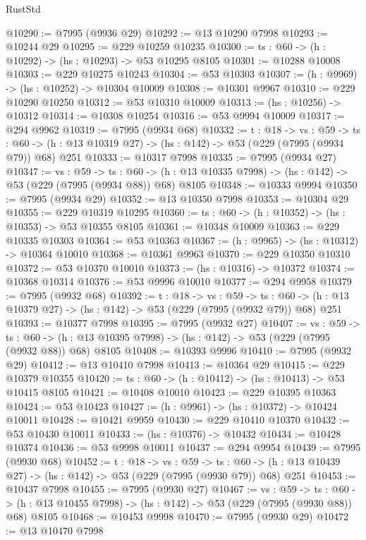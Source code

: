 \begin{lexlean}{RustStd}
\begin{coremodule}
@10290 := @7995 (@9936 @29)
@10292 := @13 @10290 @7998
@10293 := @10244 @29
@10295 := @229 @10259 @10235
@10300 := {ts : @60} -> (h : @10292) -> (hs : @10293) -> @53 @10295 @8105
@10301 := @10288 @10008
@10303 := @229 @10275 @10243
@10304 := @53 @10303
@10307 := (h : @9969) -> (hs : @10252) -> @10304 @10009
@10308 := @10301 @9967
@10310 := @229 @10290 @10250
@10312 := @53 @10310 @10009
@10313 := (hs : @10256) -> @10312
@10314 := @10308 @10254
@10316 := @53 @9994 @10009
@10317 := @294 @9962
@10319 := @7995 (@9934 @68)
@10332 := {t : @18} ->
  {vs : @59} ->
  {ts : @60} -> (h : @13 @10319 @27) -> (hs : @142) -> @53 (@229 (@7995 (@9934 @79)) @68) @251
@10333 := @10317 @7998
@10335 := @7995 (@9934 @27)
@10347 := {vs : @59} ->
  {ts : @60} -> (h : @13 @10335 @7998) -> (hs : @142) -> @53 (@229 (@7995 (@9934 @88)) @68) @8105
@10348 := @10333 @9994
@10350 := @7995 (@9934 @29)
@10352 := @13 @10350 @7998
@10353 := @10304 @29
@10355 := @229 @10319 @10295
@10360 := {ts : @60} -> (h : @10352) -> (hs : @10353) -> @53 @10355 @8105
@10361 := @10348 @10009
@10363 := @229 @10335 @10303
@10364 := @53 @10363
@10367 := (h : @9965) -> (hs : @10312) -> @10364 @10010
@10368 := @10361 @9963
@10370 := @229 @10350 @10310
@10372 := @53 @10370 @10010
@10373 := (hs : @10316) -> @10372
@10374 := @10368 @10314
@10376 := @53 @9996 @10010
@10377 := @294 @9958
@10379 := @7995 (@9932 @68)
@10392 := {t : @18} ->
  {vs : @59} ->
  {ts : @60} -> (h : @13 @10379 @27) -> (hs : @142) -> @53 (@229 (@7995 (@9932 @79)) @68) @251
@10393 := @10377 @7998
@10395 := @7995 (@9932 @27)
@10407 := {vs : @59} ->
  {ts : @60} -> (h : @13 @10395 @7998) -> (hs : @142) -> @53 (@229 (@7995 (@9932 @88)) @68) @8105
@10408 := @10393 @9996
@10410 := @7995 (@9932 @29)
@10412 := @13 @10410 @7998
@10413 := @10364 @29
@10415 := @229 @10379 @10355
@10420 := {ts : @60} -> (h : @10412) -> (hs : @10413) -> @53 @10415 @8105
@10421 := @10408 @10010
@10423 := @229 @10395 @10363
@10424 := @53 @10423
@10427 := (h : @9961) -> (hs : @10372) -> @10424 @10011
@10428 := @10421 @9959
@10430 := @229 @10410 @10370
@10432 := @53 @10430 @10011
@10433 := (hs : @10376) -> @10432
@10434 := @10428 @10374
@10436 := @53 @9998 @10011
@10437 := @294 @9954
@10439 := @7995 (@9930 @68)
@10452 := {t : @18} ->
  {vs : @59} ->
  {ts : @60} -> (h : @13 @10439 @27) -> (hs : @142) -> @53 (@229 (@7995 (@9930 @79)) @68) @251
@10453 := @10437 @7998
@10455 := @7995 (@9930 @27)
@10467 := {vs : @59} ->
  {ts : @60} -> (h : @13 @10455 @7998) -> (hs : @142) -> @53 (@229 (@7995 (@9930 @88)) @68) @8105
@10468 := @10453 @9998
@10470 := @7995 (@9930 @29)
@10472 := @13 @10470 @7998

\end{coremodule}
\end{lexlean}
